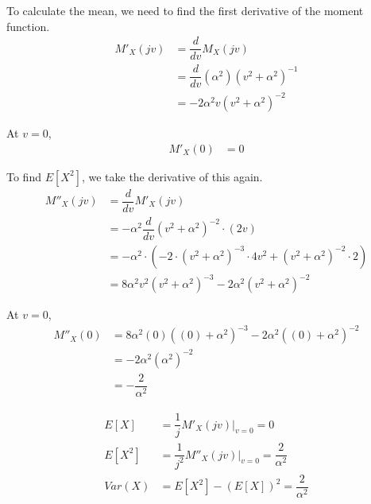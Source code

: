 \documentclass[11pt]{article}
\begin{document}
\begin{enumerate}[label=(\alph*)]
\begin{solution}
        To calculate the mean, we need to find the first derivative of the moment function.
        \begin{align*}
            M'_X(jv) &= \dfrac{d}{dv} M_X(jv) \\
            &= \dfrac{d}{dv} (\alpha^2)(v^2 + \alpha^2)^{-1} \\
            &= -2\alpha^2 v(v^2 + \alpha^2)^{-2}
        \end{align*}

        At $v = 0$,
        \begin{align*}
            M'_X(0) &= 0
        \end{align*}

        To find $E[X^2]$, we take the derivative of this again.
        \begin{align*}
            M''_X(jv) &= \dfrac{d}{dv} M'_X(jv) \\
            &= -\alpha^2 \dfrac{d}{dv} (v^2 + \alpha^2)^{-2}\cdot(2v) \\
            &= -\alpha^2\cdot(-2\cdot(v^2 + \alpha^2)^{-3}\cdot 4v^2 + (v^2 + \alpha^2)^{-2} \cdot 2) \\
            &= 8\alpha^2 v^2(v^2 + \alpha^2)^{-3} - 2\alpha^2(v^2 + \alpha^2)^{-2}
        \end{align*}

        At $v = 0$,
        \begin{align*}
            M''_X(0) &= 8\alpha^2 (0)((0) + \alpha^2)^{-3} - 2\alpha^2((0) + \alpha^2)^{-2} \\
            &= - 2\alpha^2(\alpha^2)^{-2} \\
            &= - \dfrac{2}{\alpha^2}
        \end{align*}

        \begin{align*}
            E[X] &= \dfrac{1}{j} M'_X(jv) |_{v = 0} = 0 \\
            E[X^2] &= \dfrac{1}{j^2} M''_X(jv) |_{v = 0} = \dfrac{2}{\alpha^2} \\
            Var(X) &= E[X^2] - (E[X])^2 = \dfrac{2}{\alpha^2}
        \end{align*}

    \end{solution}

    \vspace{5em}

\end{enumerate}

\newpage
\end{document}
